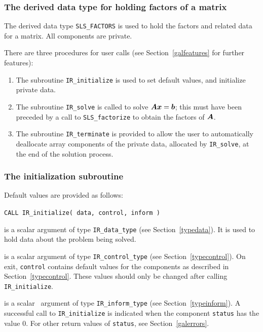 \documentclass{galahad}
\newcommand{\packagename}{IR}
\begin{document}

\subsubsection{The derived data type for holding factors of a matrix}
\label{typefactors}
The derived data type
{\tt SLS\_FACTORS}
is used to hold the factors and related data for a matrix.
All components are private.


\galarguments
There are three procedures for user calls
(see Section~\ref{galfeatures} for further features):

\begin{enumerate}
\item The subroutine
      {\tt \packagename\_initialize}
      is used to set default values, and initialize private data.
\item The subroutine
      {\tt \packagename\_solve}
      is called to solve ${\bm{A}} {\bm{x}} = {\bm{b}}$; this must have been preceded
      by a call to {\tt SLS\_factorize} to obtain the factors of ${\bm{A}}$.
\item The subroutine
      {\tt \packagename\_terminate}
      is provided to allow the user to automatically deallocate array
       components of the private data, allocated by
       {\tt \packagename\_solve},
       at the end of the solution process.
\end{enumerate}


\subsubsection{The initialization subroutine}\label{subinit}
 Default values are provided as follows:

\hskip0.5in
{\tt CALL \packagename\_initialize( data, control, inform )}

\begin{description}

 is a scalar \intentinout argument of type
{\tt \packagename\_data\_type}
(see Section~\ref{typedata}). It is used to hold data about the problem being
solved.

 is a scalar \intentout argument of type
{\tt \packagename\_control\_type}
(see Section~\ref{typecontrol}).
On exit, {\tt control} contains default values for the components as
described in Section~\ref{typecontrol}.
These values should only be changed after calling
{\tt \packagename\_initialize}.

 is a scalar \intentout\ argument of type
{\tt \packagename\_inform\_type}
(see Section~\ref{typeinform}). A successful call to
{\tt \packagename\_initialize}
is indicated when the  component {\tt status} has the value 0.
For other return values of {\tt status}, see Section~\ref{galerrors}.

\end{description}
\end{document}
